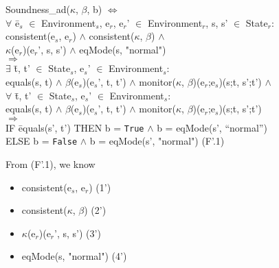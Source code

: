 \documentclass[conference]{IEEEtran}
\begin{document}
\begin{tabbing}
Soundness\_ad($\kappa$, $\beta$, b) $\Leftrightarrow$
\\$\forall$ \=e$_s$ $\in$ Environment$_s$, e$_r$, e$_r$' $\in$ Environment$_r$, s, s' $\in$ State$_r$:
\\\>consistent(e$_s$, e$_r$) $\wedge$ consistent($\kappa$, $\beta$) $\wedge$ 
\\\>\textlbrackdbl $\kappa$\textrbrackdbl(e$_r$)(e$_r$', s, s') $\wedge$ eqMode(s, "normal")
\\$\Rightarrow$
\\\>$\exists$ \=t, t' $\in$ State$_s$, e$_s$' $\in$ Environment$_s$: 
\\\>\>equals(s, t) $\wedge$ \textlbrackdbl $\beta$\textrbrackdbl(e$_s$)(e$_s$', t, t') $\wedge$ monitor($\kappa$, $\beta$)(e$_r$;e$_s$)(s;t, s';t')
$\wedge$
\\\>$\forall$ \=t, t' $\in$ State$_s$, e$_s$' $\in$ Environment$_s$: 
\\\>\>equals(s, t) $\wedge$ \textlbrackdbl $\beta$\textrbrackdbl(e$_s$)(e$_s$', t, t') $\wedge$ monitor($\kappa$, $\beta$)(e$_r$;e$_s$)(s;t, s';t')
\\\>$\Rightarrow$ \=
\\\>\>IF \=equals(s', t')  THEN b = \texttt{True} $\wedge$ b = eqMode(s', ``normal'')
\\\>\>ELSE b = \texttt{False} $\wedge$ b = eqMode(s', "normal")  \hspace*{1cm} (F'.1)
\end{tabbing}

\noindent From (F'.1), we know 

\begin{itemize}
\item consistent(e$_s$, e$_r$)  \hspace*{1.5cm}(1')
\item consistent($\kappa$, $\beta$)  \hspace*{1.6cm} (2')
\item \textlbrackdbl $\kappa$\textrbrackdbl(e$_r$)(e$_r$', s, s')   \hspace*{1.4cm} (3')
\item eqMode(s, "normal")   \hspace*{0.9cm} (4')
\end{itemize}
\end{document}
